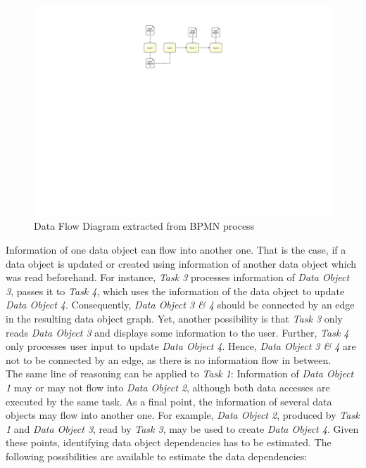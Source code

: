 \begin{figure}[h!]
	\centering
	\includegraphics[width=12cm, trim={10cm 14.5cm 10cm 2cm}]{img/DataFlowExample.pdf}
	\caption{Data Flow Diagram extracted from BPMN process}
	\label{fig:dataFlowExample}
\end{figure}

\noindent
Information of one data object can flow into another one. That is the case, if a data object is updated or created using information of another data object which was read beforehand. 
For instance, \textit{Task 3} processes information of \textit{Data Object 3}, passes it to \textit{Task 4}, which uses the information of the data object to update \textit{Data Object 4}. Consequently, \textit{Data Object 3 \& 4} should be connected by an edge in the resulting data object graph. Yet, another possibility is that \textit{Task 3} only reads \textit{Data Object 3} and displays some information to the user. Further, \textit{Task 4} only processes user input to update \textit{Data Object 4}. Hence, \textit{Data Object 3 \& 4} are not to be connected by an edge, as there is no information flow in between. \\
The same line of reasoning can be applied to \textit{Task 1}: Information of \textit{Data Object 1} may or may not flow into \textit{Data Object 2}, although both data accesses are executed by the same task. As a final point, the information of several data objects may flow into another one. For example, \textit{Data Object 2}, produced by \textit{Task 1} and \textit{Data Object 3}, read by \textit{Task 3}, may be used to create \textit{Data Object 4}. Given these points, identifying data object dependencies has to be estimated. The following possibilities are available to estimate the data dependencies:


